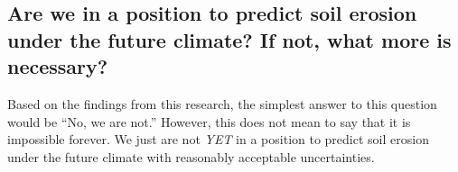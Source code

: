 


\subsection{Are we in a position to predict soil erosion under the future
climate? If not, what more is necessary?}
\label{sec:PastAndPresentRatesOfRainfallIntensity}
Based on the findings from this research, the simplest answer to this question
would be ``No, we are not.'' However, this does not mean to say that it is
impossible forever. We just are not \emph{YET} in a position to predict soil
erosion under the future climate with reasonably acceptable uncertainties.


